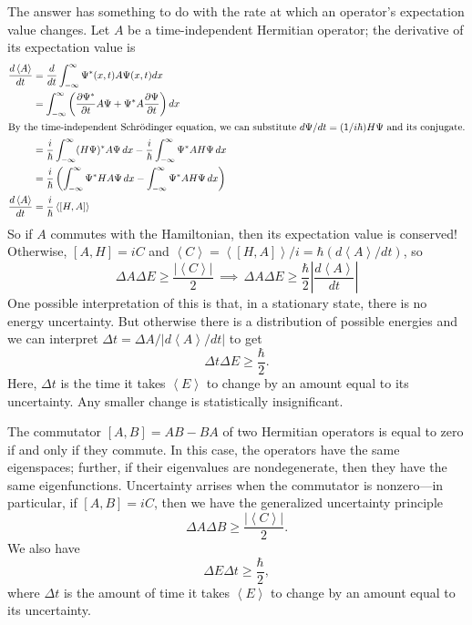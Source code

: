 \documentclass[../p052main.tex]{subfiles}
\begin{document}
The answer has something to do with the rate at which an operator's expectation value changes.
Let $A$ be a time-independent Hermitian operator; the derivative of its expectation value is
\begin{align*}
    \frac{d \left< A \right>}{dt} &= \frac{d}{dt} \int_{-\infty}^{\infty} \Psi^*(x,t) A \Psi (x,t) dx \\
    &= \int_{-\infty}^{\infty} \left( \frac{\partial \Psi^*}{\partial t} A \Psi + \Psi^* A \frac{\partial \Psi}{\partial t} \right) dx \\
    \intertext{By the time-independent Schrödinger equation, we can substitute $d\Psi / dt = (1 / i\hbar) H \Psi$ and its conjugate.}
    &= \frac{i}{\hbar} \int_{-\infty}^{\infty} (H \Psi)^* A \Psi \,dx - \frac{i}{\hbar} \int_{-\infty}^{\infty} \Psi^* A H \Psi \,dx \\
    &= \frac{i}{\hbar} \left( \int_{-\infty}^{\infty} \Psi^* H A \Psi \,dx - \int_{-\infty}^{\infty} \Psi^* A H \Psi \,dx \right) \\
    \frac{d \left< A \right>}{dt} &= \frac{i}{\hbar} \left< [H, A] \right>
\end{align*}
So if $A$ commutes with the Hamiltonian, then its expectation value is conserved!
Otherwise, $[A, H] = iC$ and $\left< C \right> = \left< [H, A] \right> / i = \hbar (d \left< A \right> / dt)$, so
\[ \Delta A \Delta E \geq \frac{|\left< C \right>|}{2} \,\implies\, \Delta A \Delta E \geq \frac{\hbar}{2} \left| \frac{d \left< A \right>}{dt} \right| \]
One possible interpretation of this is that, in a stationary state, there is no energy uncertainty.
But otherwise there is a distribution of possible energies and we can interpret
$\Delta t = \Delta A / |d \left< A \right> / dt|$ to get
\[ \Delta t \Delta E \geq \frac{\hbar}{2}. \]
Here, $\Delta t$ is the time it takes $\left< E \right>$ to change by an amount equal to its uncertainty.
Any smaller change is statistically insignificant.

\begin{summary}
    The commutator $[A,B] = AB - BA$ of two Hermitian operators is equal to zero if and only if they commute.
    In this case, the operators have the same eigenspaces; further, if their eigenvalues are nondegenerate, then they have the same eigenfunctions.
    Uncertainty arrises when the commutator is nonzero---in particular, if $[A,B] = iC$, then we have the generalized uncertainty principle
    \[ \Delta A \Delta B \geq \frac{|\left< C \right>|}{2}. \]
    We also have
    \[ \Delta E \Delta t \geq \frac{\hbar}{2}, \]
    where $\Delta t$ is the amount of time it takes $\left< E \right>$ to change by an amount equal to its uncertainty.
\end{summary}
\end{document}
